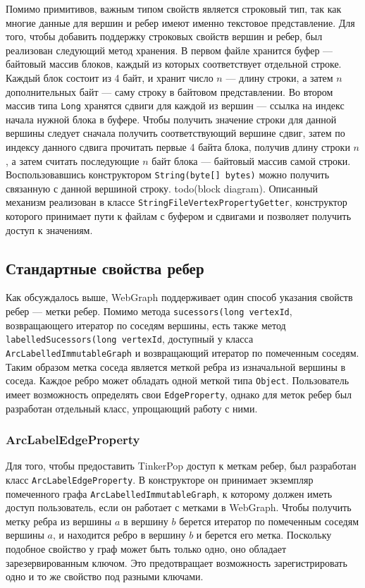 \documentclass[times,specification,annotation]{itmo-student-thesis}
\begin{document}
Помимо примитивов, важным типом свойств является строковый тип, так как многие данные для вершин и ребер имеют именно текстовое представление. Для того, чтобы добавить поддержку строковых свойств вершин и ребер, был реализован следующий метод хранения. В первом файле хранится буфер --- байтовый массив блоков, каждый из которых соответствует отдельной строке. Каждый блок состоит из 4 байт, и хранит число $n$ --- длину строки, а затем $n$ дополнительных байт --- саму строку в байтовом представлении. Во втором массив типа \texttt{Long} хранятся сдвиги для каждой из вершин --- ссылка на индекс начала нужной блока в буфере. Чтобы получить значение строки для данной вершины следует сначала получить соответствующий вершине сдвиг, затем по индексу данного сдвига прочитать первые 4 байта блока, получив длину строки $n$, а затем считать последующие $n$ байт блока --- байтовый массив самой строки. Воспользовавшись конструктором \texttt{String(byte[] bytes)} можно получить связанную с данной вершиной строку. todo(block diagram). 
Описанный механизм реализован в классе \texttt{StringFileVertexPropertyGetter}, конструктор которого принимает пути к файлам с буфером и сдвигами и позволяет получить доступ к значениям.

\subsection{Стандартные свойства ребер}

Как обсуждалось выше, WebGraph поддерживает один способ указания свойств ребер --- метки ребер. Помимо метода \texttt{sucessors(long vertexId}, возвращающего итератор по соседям вершины, есть также метод \texttt{labelledSucessors(long vertexId}, доступный у класса \texttt{ArcLabelledImmutableGraph} и возвращающий итератор по помеченным соседям. Таким образом метка соседа является меткой ребра из изначальной вершины в соседа. Каждое ребро может обладать одной меткой типа \texttt{Object}. Пользователь имеет возможность определять свои \texttt{EdgeProperty}, однако для меток ребер был разработан отдельный класс, упрощающий работу с ними.

\subsubsection{ArcLabelEdgeProperty}

Для того, чтобы предоставить TinkerPop доступ к меткам ребер, был разработан класс \texttt{ArcLabelEdgeProperty}. В конструкторе он принимает экземпляр помеченного графа \texttt{ArcLabelledImmutableGraph}, к которому должен иметь доступ пользователь, если он работает с метками в WebGraph. Чтобы получить метку ребра из вершины $a$ в вершину $b$ берется итератор по помеченным соседям вершины $a$, и находится ребро в вершину $b$ и берется его метка. Поскольку подобное свойство у граф может быть только одно, оно обладает зарезервированным ключом. Это предотвращает возможность зарегистрировать одно и то же свойство под разными ключами.
\end{document}
